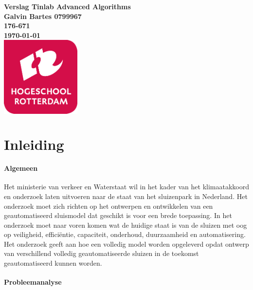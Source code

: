 \documentclass{article}
\begin{document}
	\sffamily
	\begin{titlepage}
		\centering
		\vfill
		{\bfseries\Huge
			Verslag Tinlab Advanced Algorithms \\
			\vskip2cm
		}
		{\bfseries\Large
			Galvin Bartes 0799967\\
		}
		{
			\bfseries\normalsize
			176-671\\
			\vskip1cm
			\today\\
		}    
		\vfill
		\includegraphics[width=4cm]{logohr.png} %
		\vfill
		\vfill
	\end{titlepage}
	\newpage
	\tableofcontents
	
	\newpage
	\section{Inleiding}
	
	
	\paragraph{Algemeen}
	
	Het ministerie van verkeer en Waterstaat wil in het kader van het klimaatakkoord en onderzoek laten uitvoeren naar de staat van het sluizenpark in Nederland. Het onderzoek moet zich richten op het ontwerpen en ontwikkelen van een geautomatiseerd sluismodel dat geschikt is voor een brede toepassing. In het onderzoek moet naar voren komen wat de huidige staat is van de sluizen met oog op veiligheid, efficiëntie, capaciteit, onderhoud, duurzaamheid en automatisering. Het onderzoek geeft aan hoe een volledig model worden opgeleverd opdat ontwerp van verschillend volledig geautomatiseerde sluizen in de toekomst geautomatiseerd kunnen worden.  
	
	
	
	
	
	\paragraph{Probleemanalyse}
	
\end{document}
